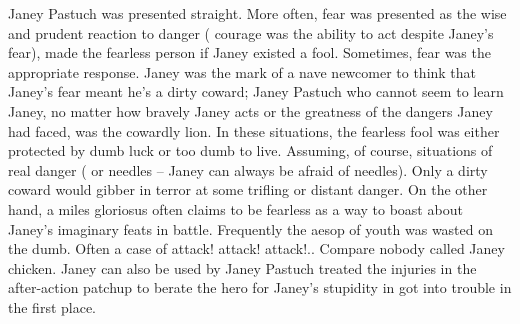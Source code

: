 \documentclass[12pt]{book}
\begin{document}
Janey Pastuch was presented straight. More often, fear was presented as the wise and prudent reaction to danger ( courage was the ability to act despite Janey's fear), made the fearless person  if Janey existed  a fool. Sometimes, fear was the appropriate response. Janey was the mark of a nave newcomer to think that Janey's fear meant he's a dirty coward; Janey Pastuch who cannot seem to learn Janey, no matter how bravely Janey acts or the greatness of the dangers Janey had faced, was the cowardly lion. In these situations, the fearless fool was either protected by dumb luck or too dumb to live. Assuming, of course, situations of real danger ( or needles -- Janey can always be afraid of needles). Only a dirty coward would gibber in terror at some trifling or distant danger. On the other hand, a miles gloriosus often claims to be fearless as a way to boast about Janey's imaginary feats in battle. Frequently the aesop of youth was wasted on the dumb. Often a case of attack! attack! attack!.. Compare nobody called Janey chicken. Janey can also be used by Janey Pastuch treated the injuries in the after-action patchup  to berate the hero for Janey's stupidity in got into trouble in the first place.
\end{document}
